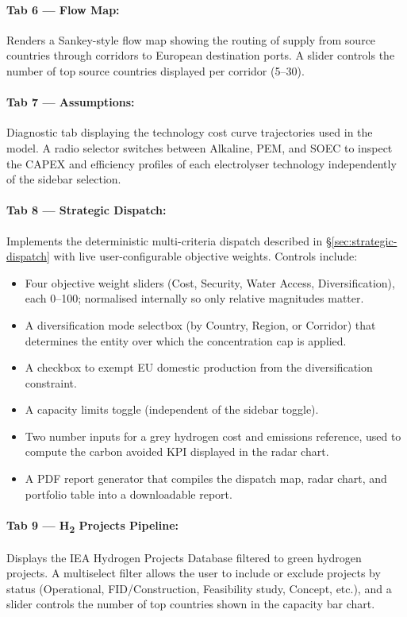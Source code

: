 \paragraph{Tab 6 — Flow Map:} Renders a Sankey-style flow map showing the routing of supply from source countries through corridors to European destination ports. A slider controls the number of top source countries displayed per corridor (5--30).

\paragraph{Tab 7 — Assumptions:} Diagnostic tab displaying the technology cost curve trajectories used in the model. A radio selector switches between Alkaline, PEM, and SOEC to inspect the CAPEX and efficiency profiles of each electrolyser technology independently of the sidebar selection.

\paragraph{Tab 8 — Strategic Dispatch:} Implements the deterministic multi-criteria dispatch described in \S\ref{sec:strategic-dispatch} with live user-configurable objective weights. Controls include:
\begin{itemize}
    \item Four objective weight sliders (Cost, Security, Water Access, Diversification), each 0--100; normalised internally so only relative magnitudes matter.
    \item A diversification mode selectbox (by Country, Region, or Corridor) that determines the entity over which the concentration cap is applied.
    \item A checkbox to exempt EU domestic production from the diversification constraint.
    \item A capacity limits toggle (independent of the sidebar toggle).
    \item Two number inputs for a grey hydrogen cost and emissions reference, used to compute the carbon avoided KPI displayed in the radar chart.
    \item A PDF report generator that compiles the dispatch map, radar chart, and portfolio table into a downloadable report.
\end{itemize}

\paragraph{Tab 9 — H\textsubscript{2} Projects Pipeline:} Displays the IEA Hydrogen Projects Database filtered to green hydrogen projects. A multiselect filter allows the user to include or exclude projects by status (Operational, FID/Construction, Feasibility study, Concept, etc.), and a slider controls the number of top countries shown in the capacity bar chart.

